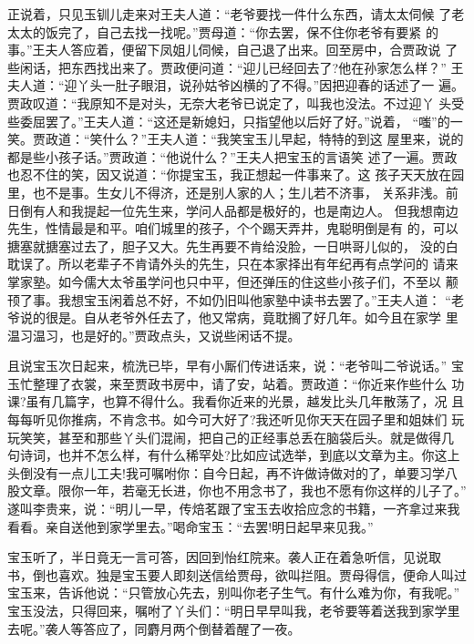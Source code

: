 正说着，只见玉钏儿走来对王夫人道：“老爷要找一件什么东西，请太太伺候
了老太太的饭完了，自己去找一找呢。”贾母道：“你去罢，保不住你老爷有要紧
的事。”王夫人答应着，便留下凤姐儿伺候，自己退了出来。回至房中，合贾政说
了些闲话，把东西找出来了。贾政便问道：“迎儿已经回去了?他在孙家怎么样？”
王夫人道：“迎丫头一肚子眼泪，说孙姑爷凶横的了不得。”因把迎春的话述了一
遍。贾政叹道：“我原知不是对头，无奈大老爷已说定了，叫我也没法。不过迎丫
头受些委屈罢了。”王夫人道：“这还是新媳妇，只指望他以后好了好。”说着，
“嗤”的一笑。贾政道：“笑什么？”王夫人道：“我笑宝玉儿早起，特特的到这
屋里来，说的都是些小孩子话。”贾政道：“他说什么？”王夫人把宝玉的言语笑
述了一遍。贾政也忍不住的笑，因又说道：“你提宝玉，我正想起一件事来了。这
孩子天天放在园里，也不是事。生女儿不得济，还是别人家的人；生儿若不济事，
关系非浅。前日倒有人和我提起一位先生来，学问人品都是极好的，也是南边人。
但我想南边先生，性情最是和平。咱们城里的孩子，个个踢天弄井，鬼聪明倒是有
的，可以搪塞就搪塞过去了，胆子又大。先生再要不肯给没脸，一日哄哥儿似的，
没的白耽误了。所以老辈子不肯请外头的先生，只在本家择出有年纪再有点学问的
请来掌家塾。如今儒大太爷虽学问也只中平，但还弹压的住这些小孩子们，不至以
颟顸了事。我想宝玉闲着总不好，不如仍旧叫他家塾中读书去罢了。”王夫人道：
“老爷说的很是。自从老爷外任去了，他又常病，竟耽搁了好几年。如今且在家学
里温习温习，也是好的。”贾政点头，又说些闲话不提。

且说宝玉次日起来，梳洗已毕，早有小厮们传进话来，说：“老爷叫二爷说话。”
宝玉忙整理了衣裳，来至贾政书房中，请了安，站着。贾政道：“你近来作些什么
功课?虽有几篇字，也算不得什么。我看你近来的光景，越发比头几年散荡了，况
且每每听见你推病，不肯念书。如今可大好了?我还听见你天天在园子里和姐妹们
玩玩笑笑，甚至和那些丫头们混闹，把自己的正经事总丢在脑袋后头。就是做得几
句诗词，也并不怎么样，有什么稀罕处?比如应试选举，到底以文章为主。你这上
头倒没有一点儿工夫!我可嘱咐你：自今日起，再不许做诗做对的了，单要习学八
股文章。限你一年，若毫无长进，你也不用念书了，我也不愿有你这样的儿子了。”
遂叫李贵来，说：“明儿一早，传焙茗跟了宝玉去收拾应念的书籍，一齐拿过来我
看看。亲自送他到家学里去。”喝命宝玉：“去罢!明日起早来见我。”

宝玉听了，半日竟无一言可答，因回到怡红院来。袭人正在着急听信，见说取
书，倒也喜欢。独是宝玉要人即刻送信给贾母，欲叫拦阻。贾母得信，便命人叫过
宝玉来，告诉他说：“只管放心先去，别叫你老子生气。有什么难为你，有我呢。”
宝玉没法，只得回来，嘱咐了丫头们：“明日早早叫我，老爷要等着送我到家学里
去呢。”袭人等答应了，同麝月两个倒替着醒了一夜。

